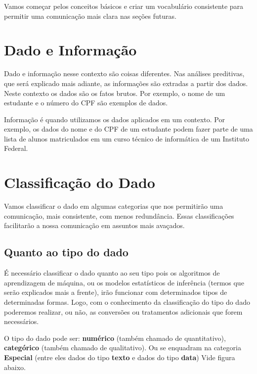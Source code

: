 \documentclass[
]{book}
\begin{document}
Vamos começar pelos conceitos básicos e criar um vocabulário consistente para permitir uma comunicação mais clara nas seções futuras.

\hypertarget{dado-e-informauxe7uxe3o}{%
\section{Dado e Informação}\label{dado-e-informauxe7uxe3o}}

Dado e informação nesse contexto são coisas diferentes. Nas análises preditivas, que será explicado mais adiante, as informações são extradas a partir dos dados. Neste contexto os dados são os fatos brutos. Por exemplo, o nome de um estudante e o número do CPF são exemplos de dados.

Informação é quando utilizamos os dados aplicados em um contexto. Por exemplo, os dados do nome e do CPF de um estudante podem fazer parte de uma lista de alunos matriculados em um curso técnico de informática de um Instituto Federal.

\hypertarget{classificauxe7uxe3o-do-dado}{%
\section{Classificação do Dado}\label{classificauxe7uxe3o-do-dado}}

Vamos classificar o dado em algumas categorias que nos permitirão uma comunicação, mais consistente, com menos redundância. Essas classificações facilitarão a nossa comunicação em assuntos mais avaçados.

\hypertarget{quanto-ao-tipo-do-dado}{%
\subsection{Quanto ao tipo do dado}\label{quanto-ao-tipo-do-dado}}

É necessário classificar o dado quanto ao seu tipo pois os algoritmos de aprendizagem de máquina, ou os modelos estatísticos de inferência (termos que serão explicados mais a frente), irão funcionar com determinados tipos de determinadas formas. Logo, com o conhecimento da classificação do tipo do dado poderemos realizar, ou não, as conversões ou tratamentos adicionais que forem necessários.

O tipo do dado pode ser: \textbf{numérico} (também chamado de quantitativo), \textbf{categórico} (também chamado de qualitativo). Ou se enquadram na categoria \textbf{Especial} (entre eles dados do tipo \textbf{texto} e dados do tipo \textbf{data}) Vide figura abaixo.
\end{document}
